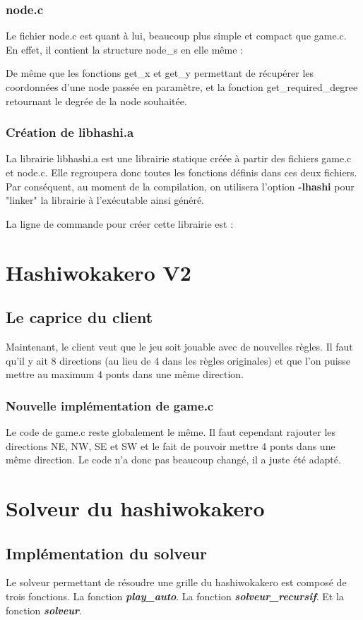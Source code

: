 \documentclass[12]{report}
\begin{document}
		\subsection{node.c}
			Le fichier node.c est quant à lui, beaucoup plus simple et compact que game.c. En effet, il contient la structure node\_s en elle même :
			
			De même que les fonctions get\_x et get\_y permettant de récupérer les coordonnées d'une node passée en paramètre, et la fonction get\_required\_degree retournant le degrée de la node souhaitée.
		\subsection{Création de libhashi.a}
			La librairie libhashi.a est une librairie statique créée à partir des fichiers game.c et node.c.
			Elle regroupera donc toutes les fonctions définis dans ces deux fichiers. Par conséquent, au moment de la compilation,
			on utilisera l'option \textbf{-lhashi} pour "linker" la librairie à l'exécutable ainsi généré.

			La ligne de commande pour créer cette librairie est : 


	\chapter{Hashiwokakero V2}
		\section{Le caprice du client}
		Maintenant, le client veut que le jeu soit jouable avec de nouvelles règles. Il faut qu'il y ait 8 directions
		(au lieu de 4 dans les règles originales) et que l'on puisse mettre au maximum 4 ponts dans une même direction.
		\subsection{Nouvelle implémentation de game.c}
		Le code de game.c reste globalement le même. Il faut cependant rajouter les directions NE, NW, SE et SW et le fait
		de pouvoir mettre 4 ponts dans une même direction. Le code n'a donc pas beaucoup changé, il a juste été adapté.
	\chapter{Solveur du hashiwokakero}
		\section{Implémentation du solveur}
		Le solveur permettant de résoudre une grille du hashiwokakero est composé de trois fonctions.
		La fonction \textbf{\emph{play\_auto}}.
		La fonction \textbf{\emph{solveur\_recursif}}.
		Et la fonction \textbf{\emph{solveur}}.
\end{document}
